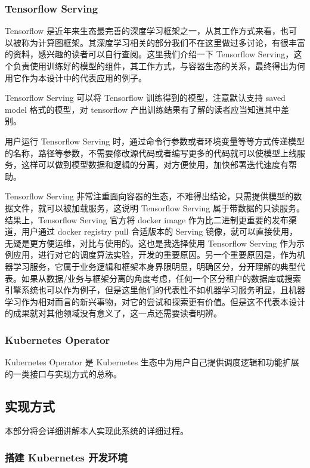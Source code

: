 \subsubsection{Tensorflow Serving}

Tensorflow 是近年来生态最完善的深度学习框架之一，从其工作方式来看，也可以被称为计算图框架。其深度学习相关的部分我们不在这里做过多讨论，有很丰富的资料，感兴趣的读者可以自行查阅。这里我们介绍一下 Tensorflow Serving，这个负责使用训练好的模型的组件，其工作方式，与容器生态的关系，最终得出为何用它作为本设计中的代表应用的例子。

Tensorflow Serving 可以将 Tensorflow 训练得到的模型，注意默认支持 saved model 格式的模型，对 tensorflow 产出训练结果有了解的读者应当知道其中差别。

用户运行 Tensorflow Serving 时，通过命令行参数或者环境变量等等方式传递模型的名称，路径等参数，不需要修改源代码或者编写更多的代码就可以使模型上线服务，这样可以做到模型数据和逻辑的分离，对方便使用，加快部署迭代速度有帮助。

Tensorflow Serving 非常注重面向容器的生态，不难得出结论，只需提供模型的数据文件，就可以被加载服务，这说明 Tensorflow Serving 属于带数据的只读服务。结果上，Tensorflow Serving 官方将 docker image 作为比二进制更重要的发布渠道，用户通过 docker registry pull 合适版本的 Serving 镜像，就可以直接使用，无疑是更方便运维，对比与使用的。这也是我选择使用 Tensorflow Serving 作为示例应用，进行对它的调度算法实验，开发的重要原因。另一个重要原因是，作为机器学习服务，它属于业务逻辑和框架本身界限明显，明确区分，分开理解的典型代表。如果从数据/业务与框架分离的角度考虑，任何一个区分租户的数据库或搜索引擎系统也可以作为例子，但是这里他们的代表性不如机器学习服务明显，且机器学习作为相对而言的新兴事物，对它的尝试和探索更有价值。但是这不代表本设计的成果就对其他领域没有意义了，这一点还需要读者明辨。

\subsubsection{Kubernetes Operator}

Kubernetes Operator 是 Kubernetes 生态中为用户自己提供调度逻辑和功能扩展的一类接口与实现方式的总称。

\subsection{实现方式}

本部分将会详细讲解本人实现此系统的详细过程。

\subsubsection{搭建 Kubernetes 开发环境}

